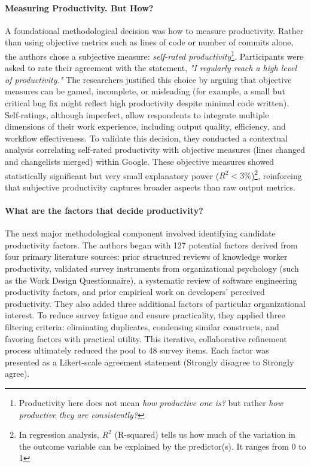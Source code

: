 \paragraph{Measuring Productivity. But How?}
A foundational methodological decision was how to measure productivity. Rather than using objective metrics such as lines of code or number of commits alone, the authors chose a subjective measure: \textit{self-rated productivity}\footnote{Productivity here does not mean \textit{how productive one is?} but rather \textit{how productive they are consistently?}}. Participants were asked to rate their agreement with the statement, \textit{"I regularly reach a high level of productivity."} The researchers justified this choice by arguing that objective measures can be gamed, incomplete, or misleading (for example, a small but critical bug fix might reflect high productivity despite minimal code written). Self-ratings, although imperfect, allow respondents to integrate multiple dimensions of their work experience, including output quality, efficiency, and workflow effectiveness. To validate this decision, they conducted a contextual analysis correlating self-rated productivity with objective measures (lines changed and changelists merged) within Google. These objective measures showed statistically significant but very small explanatory power ($R^2 < 3\%$)\footnote{In regression analysis, $R^2$ (R-squared) tells us how much of the variation in the outcome variable can be explained by the predictor(s). It ranges from 0 to 1}, reinforcing that subjective productivity captures broader aspects than raw output metrics.
\paragraph{What are the factors that decide productivity?} The next major methodological component involved identifying candidate productivity factors. The authors began with 127 potential factors derived from four primary literature sources: prior structured reviews of knowledge worker productivity, validated survey instruments from organizational psychology (such as the Work Design Questionnaire), a systematic review of software engineering productivity factors, and prior empirical work on developers’ perceived productivity. They also added three additional factors of particular organizational interest. To reduce survey fatigue and ensure practicality, they applied three filtering criteria: eliminating duplicates, condensing similar constructs, and favoring factors with practical utility. This iterative, collaborative refinement process ultimately reduced the pool to 48 survey items. Each factor was presented as a Likert-scale agreement statement (Strongly disagree to Strongly agree).

